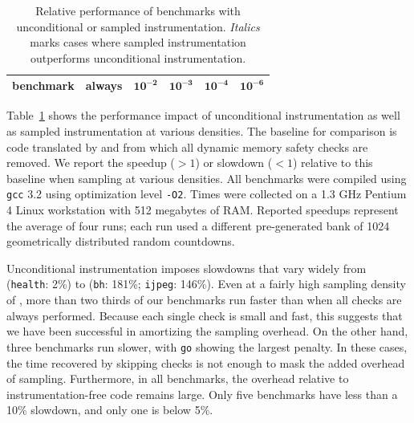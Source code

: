 \begin{table}
  \centering
  \begin{tabular}{|l|r|rrrr|}
    \hline
    \rule{0pt}{2.5ex}
    \textbf{benchmark} & \textbf{always} & $\mathbf{10^{-2}}$ & $\mathbf{10^{-3}}$ & $\mathbf{10^{-4}}$ & $\mathbf{10^{-6}}$ \\
    \hline\hline
    
  \end{tabular}
  \caption{Relative performance of \CCured benchmarks with
    unconditional or sampled instrumentation.  \textit{Italics} marks
    cases where sampled instrumentation outperforms unconditional
    instrumentation.}
  \label{tab:share:density}
\end{table}

Table~\ref{tab:share:density} shows the performance impact of
unconditional instrumentation as well as sampled instrumentation at
various densities.  The baseline for comparison is code
translated by \CCured and from which all dynamic memory
safety checks are removed.  We report the speedup ($>1$) or
slowdown ($<1$) relative to this baseline when sampling at various
densities.  All benchmarks were compiled using \texttt{gcc} 3.2 using
optimization level \texttt{-O2}.  Times were collected on a 1.3
GHz Pentium 4 Linux workstation with 512 megabytes of RAM\@.  Reported
speedups represent the average of four runs; each run used a different
pre-generated bank of 1024 geometrically distributed random
countdowns.

Unconditional instrumentation imposes slowdowns that vary widely from
(\texttt{health}: 2\%) to (\texttt{bh}: 181\%; \texttt{ijpeg}: 146\%).
Even at a fairly high sampling density of , more than
two thirds of our benchmarks run faster than when all checks are
always performed.  Because each single check is small and fast, this
suggests that we have been successful in amortizing the sampling
overhead.  On the other hand, three benchmarks run slower, with
\texttt{go} showing the largest penalty.  In these cases, the time
recovered by skipping  checks is not enough to mask
the added overhead of sampling.  Furthermore, in all benchmarks, the
overhead relative to instrumentation-free code remains large.  Only
five benchmarks have less than a 10\% slowdown, and only one is below
5\%.

